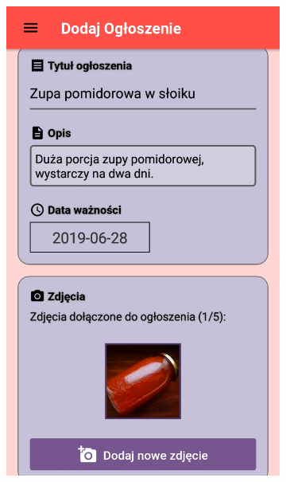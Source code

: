 \documentclass[licencjacka]{pracamgr}
\begin{document}
\newpage
\begin{figure}[H]
  \centering

  \begin{subfigure}[b]{0.4\linewidth}
    \begin{framed}
      \includegraphics[width=\linewidth]{dodawanie1.png}
    \end{framed}
  \end{subfigure}
  \begin{subfigure}[b]{0.4\linewidth}
    \begin{framed}

\end{framed}
\end{subfigure}
\end{figure}
\end{document}
